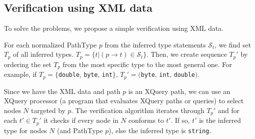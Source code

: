\subsection{Verification using XML data}
To solve the problems, we propose a simple verification using XML data.

For each normalized PathType $p$ from the inferred type statements $\mathcal{S}_t$, we find set $T_p$ of all inferred types. $T_p = \{t|(p \rightarrow t) \in \mathcal{S}_t\}$. Then, we create sequence $T_p'$ by ordering the set $T_p$ from the most specific type to the most general one. For example, if $T_p = \{$\texttt{double}, \texttt{byte}, \texttt{int}$\}$, $T_p' = ($\texttt{byte}, \texttt{int}, \texttt{double}$)$.

Since we have the XML data and path $p$ is an XQuery path, we can use an XQuery processor (a program that evaluates XQuery paths or queries) to select nodes $N$ targeted by $p$. The verification algorithm iterates through $T_p'$ and for each $t' \in T_p'$ it checks if every node in $N$ conforms to $t'$. If so, $t'$ is the inferred type for nodes $N$ (and PathType $p$), else the inferred type is \texttt{string}.
